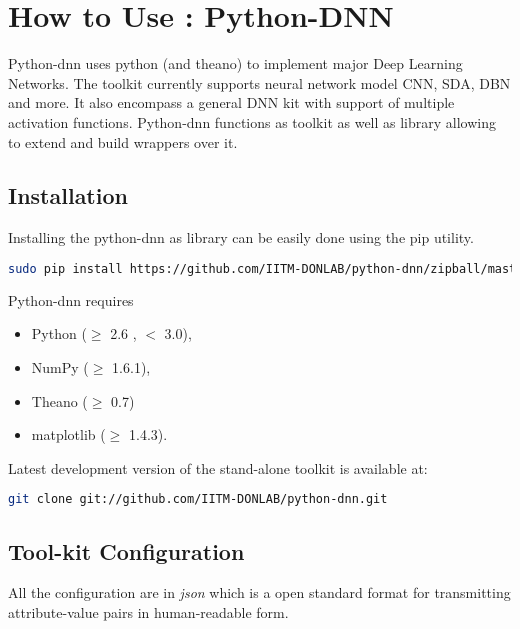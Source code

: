 \appendix
\label{app:pydnn}
\chapter{How to Use : Python-DNN}
Python-dnn uses python (and theano) to implement major Deep Learning Networks.  The toolkit currently supports neural network model CNN, SDA, DBN and more.  It also encompass a  general DNN  kit with support of multiple activation functions.  Python-dnn functions as toolkit as well as library allowing to extend and build wrappers over it.
\section{Installation}
Installing  the python-dnn as library can be easily done using the pip utility.
\begin{lstlisting}[language=bash,basicstyle=\small] 
sudo pip install https://github.com/IITM-DONLAB/python-dnn/zipball/master
\end{lstlisting}
Python-dnn requires 
\begin{itemize}
	\item Python ($\geq$ 2.6 , $<$ 3.0),
	\item NumPy ($\geq$ 1.6.1),
	\item Theano ($\geq$ 0.7)
	\item matplotlib ($\geq$ 1.4.3).
\end{itemize}
\noindent Latest development version of the stand-alone toolkit is available at:
\begin{lstlisting}[language=bash,basicstyle=\small] 
git clone git://github.com/IITM-DONLAB/python-dnn.git
\end{lstlisting}

\section{Tool-kit Configuration} 
All the configuration are in \textit{json} which is a open standard format for transmitting  attribute-value pairs in human-readable form.
